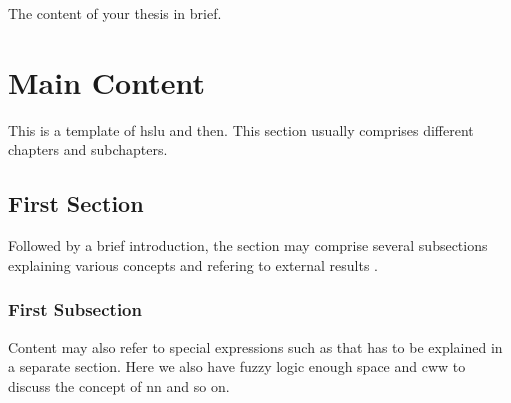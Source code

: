 \documentclass[12pt, a4paper, oneside]{book}    %
\begin{document}
\begin{abstractstyle}{\hsummary}
    The content of your thesis in brief.
\end{abstractstyle}

\tableofcontents
\listoffigures
\listoftables
\printnoidxglossaries



\mainmatter

\chapter{Main Content}
This is a template of \gls{hslu} and then. This section usually comprises different chapters and subchapters.

\section{First Section}
Followed by a brief introduction, the section may comprise several subsections explaining various concepts and refering to external results \cite{christen_exogenous_2020}.

\subsection{First Subsection}
Content may also refer to special expressions such as that has to be explained in a separate section. Here we also have \gls{fuzzy logic} enough space and \gls{cww} to discuss the concept of \gls{nn} and so on.

\begin{comment}
    This is a sample comment.
\end{comment}


\footnotesize



\appendix

\glsaddallunused                                %
\end{document}
